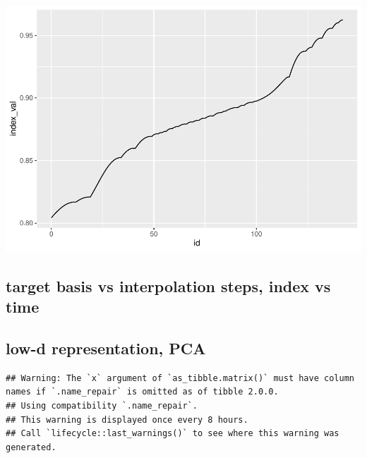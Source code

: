 \documentclass[12pt]{article}
\newenvironment{Shaded}{\begin{snugshade}}{\end{snugshade}}
\newcommand{\KeywordTok}[1]{\textcolor[rgb]{0.13,0.29,0.53}{\textbf{#1}}}
\newcommand{\NormalTok}[1]{#1}
\newcommand{\OperatorTok}[1]{\textcolor[rgb]{0.81,0.36,0.00}{\textbf{#1}}}
\newcommand{\StringTok}[1]{\textcolor[rgb]{0.31,0.60,0.02}{#1}}
\begin{document}
\begin{Shaded}
\end{Shaded}

\includegraphics{paper_files/figure-latex/unnamed-chunk-7-2.pdf}

\hypertarget{target-basis-vs-interpolation-steps-index-vs-time}{%
\subsection{target basis vs interpolation steps, index vs
time}\label{target-basis-vs-interpolation-steps-index-vs-time}}

\hypertarget{low-d-representation-pca}{%
\subsection{low-d representation, PCA}\label{low-d-representation-pca}}

\begin{Shaded}
\end{Shaded}

\begin{verbatim}
## Warning: The `x` argument of `as_tibble.matrix()` must have column names if `.name_repair` is omitted as of tibble 2.0.0.
## Using compatibility `.name_repair`.
## This warning is displayed once every 8 hours.
## Call `lifecycle::last_warnings()` to see where this warning was generated.
\end{verbatim}
\end{document}
